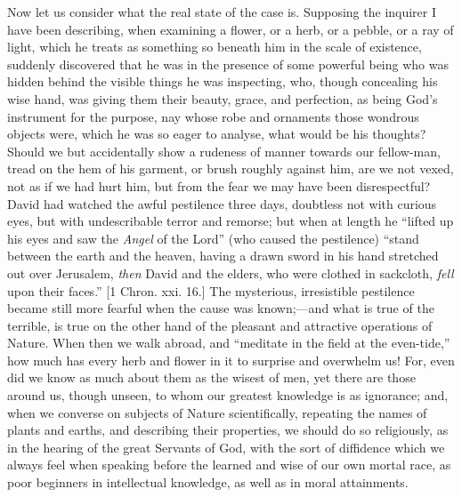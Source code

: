 Now let us consider what the real state of the case is. Supposing the
inquirer I have been describing, when examining a flower, or a herb, or
a pebble, or a ray of light, which he treats as something so beneath him
in the scale of existence, suddenly discovered that he was in the
presence of some powerful being who was hidden behind the visible things
he was inspecting, who, though concealing his wise hand, was giving them
their beauty, grace, and perfection, as being God's instrument for the
purpose, nay whose robe and ornaments those wondrous objects were, which
he was so eager to analyse, what would be his thoughts? Should we but
accidentally show a rudeness of manner towards our fellow-man, tread on
the hem of his garment, or brush roughly against him, are we not vexed,
not as if we had hurt him, but from the fear we may have been
disrespectful? David had watched the awful pestilence three days,
doubtless not with curious eyes, but with undescribable terror and
remorse; but when at length he ``lifted up his eyes and saw the \emph{Angel}
of the Lord'' (who caused the pestilence) ``stand between the
earth and the heaven, having a drawn sword in his hand stretched out
over Jerusalem, \emph{then} David and the elders, who were clothed in
sackcloth, \emph{fell} upon their faces.'' [1 Chron. xxi. 16.] The
mysterious, irresistible pestilence became still more fearful when the
cause was known;—and what is true of the terrible, is true on the
other hand of the pleasant and attractive operations of Nature. When
then we walk abroad, and ``meditate in the field at the
even-tide,'' how much has every herb and flower in it to surprise
and overwhelm us! For, even did we know as much about them as the wisest
of men, yet there are those around us, though unseen, to whom our
greatest knowledge is as ignorance; and, when we converse on subjects of
Nature scientifically, repeating the names of plants and earths, and
describing their properties, we should do so religiously, as in the
hearing of the great Servants of God, with the sort of diffidence which
we always feel when speaking before the learned and wise of our own
mortal race, as poor beginners in intellectual knowledge, as well as in
moral attainments.


